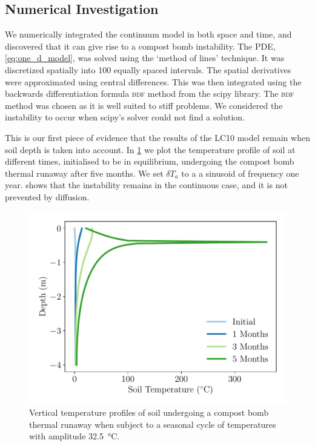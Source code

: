 \subsection{Numerical Investigation}
\label{sec:numerical_investigation}
We numerically integrated 
the continuum model in both space and time, and discovered that it can give rise to a compost bomb instability.
The PDE, \cref{eq:one_d_model}, was solved using the `method of lines' technique\cite{Schiesser2012}. It was discretized spatially into 100 equally spaced intervals.
The spatial derivatives were approximated using central differences. This was then integrated using
the backwards differentiation formula \textsc{bdf} method from the scipy library\cite{Virtanen2020}. The \textsc{bdf} method was chosen as it is well suited to stiff problems.
We considered the instability to occur when scipy's solver could not find a solution.

This is our first piece of evidence that the results of the LC10 model remain when soil depth is taken into account. In \cref{fig:vertical_profiles}
we plot the temperature profile of soil at different times, initialised to be in equilibrium, undergoing the compost bomb thermal runaway after five months.
We set $\delta T_a$ to a  a sinusoid of frequency one year.
 shows that the instability remains in the continuous case, and it is not prevented by diffusion.

\begin{figure}
  \centering
  \includegraphics[scale=0.5,keepaspectratio]{seasonal_cycle_profiles}
  \caption[Vertical profile of soil temperature]{Vertical temperature profiles of soil undergoing a compost bomb thermal runaway when subject to a seasonal cycle of temperatures with amplitude \SI{32.5}{\degreeCelsius}.}
  \label{fig:vertical_profiles}
\end{figure}
